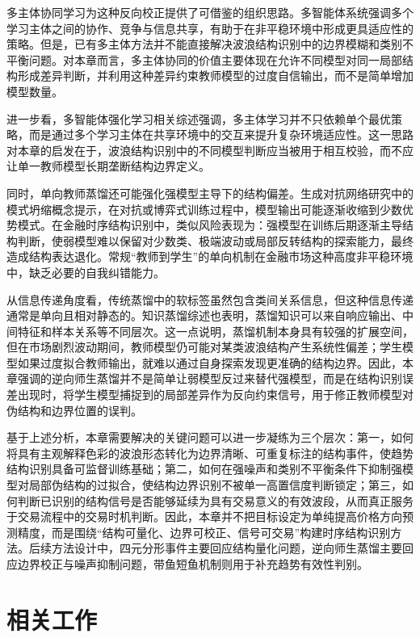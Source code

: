 多主体协同学习为这种反向校正提供了可借鉴的组织思路。多智能体系统强调多个学习主体之间的协作、竞争与信息共享，有助于在非平稳环境中形成更具适应性的策略\cite{lee2007multiagent}。但是，已有多主体方法并不能直接解决波浪结构识别中的边界模糊和类别不平衡问题。对本章而言，多主体协同的价值主要体现在允许不同模型对同一局部结构形成差异判断，并利用这种差异约束教师模型的过度自信输出，而不是简单增加模型数量。

进一步看，多智能体强化学习相关综述强调，多主体学习并不只依赖单个最优策略，而是通过多个学习主体在共享环境中的交互来提升复杂环境适应性\cite{du2019survey}。这一思路对本章的启发在于，波浪结构识别中的不同模型判断应当被用于相互校验，而不应让单一教师模型长期垄断结构边界定义。

同时，单向教师蒸馏还可能强化强模型主导下的结构偏差。生成对抗网络研究中的模式坍缩概念提示，在对抗或博弈式训练过程中，模型输出可能逐渐收缩到少数优势模式\cite{goodfellow2014generative}。在金融时序结构识别中，类似风险表现为：强模型在训练后期逐渐主导结构判断，使弱模型难以保留对少数类、极端波动或局部反转结构的探索能力，最终造成结构表达退化。常规``教师到学生''的单向机制在金融市场这种高度非平稳环境中，缺乏必要的自我纠错能力。

从信息传递角度看，传统蒸馏中的软标签虽然包含类间关系信息，但这种信息传递通常是单向且相对静态的。知识蒸馏综述也表明，蒸馏知识可以来自响应输出、中间特征和样本关系等不同层次\cite{gou2021knowledge}。这一点说明，蒸馏机制本身具有较强的扩展空间，但在市场剧烈波动期间，教师模型仍可能对某类波浪结构产生系统性偏差；学生模型如果过度拟合教师输出，就难以通过自身探索发现更准确的结构边界。因此，本章强调的逆向师生蒸馏并不是简单让弱模型反过来替代强模型，而是在结构识别误差出现时，将学生模型捕捉到的局部差异作为反向约束信号，用于修正教师模型对伪结构和边界位置的误判。

基于上述分析，本章需要解决的关键问题可以进一步凝练为三个层次：第一，如何将具有主观解释色彩的波浪形态转化为边界清晰、可重复标注的结构事件，使趋势结构识别具备可监督训练基础；第二，如何在强噪声和类别不平衡条件下抑制强模型对局部伪结构的过拟合，使结构边界识别不被单一高置信度判断锁定；第三，如何判断已识别的结构信号是否能够延续为具有交易意义的有效波段，从而真正服务于交易流程中的交易时机判断。因此，本章并不把目标设定为单纯提高价格方向预测精度，而是围绕``结构可量化、边界可校正、信号可交易''构建时序结构识别方法。后续方法设计中，四元分形事件主要回应结构量化问题，逆向师生蒸馏主要回应边界校正与噪声抑制问题，带鱼短鱼机制则用于补充趋势有效性判别。



\section{相关工作}

